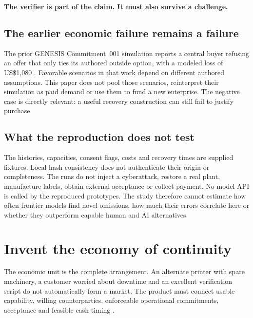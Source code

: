 \documentclass[11pt,a4paper]{article}
\newcommand{\chapterpage}{\clearpage}
\begin{document}
\begin{insight}
\textbf{The verifier is part of the claim. It must also survive a challenge.}
\end{insight}

\subsection{The earlier economic failure remains a failure}
The prior GENESIS Commitment~001 simulation reports a central buyer refusing an offer that only ties its authored outside option, with a modeled loss of US\$1,080 \cite{genesisResults}. Favorable scenarios in that work depend on different authored assumptions. This paper does not pool those scenarios, reinterpret their simulation as paid demand or use them to fund a new enterprise. The negative case is directly relevant: a useful recovery construction can still fail to justify purchase.

\subsection{What the reproduction does not test}
The histories, capacities, consent flags, costs and recovery times are supplied fixtures. Local hash consistency does not authenticate their origin or completeness. The runs do not inject a cyberattack, restore a real plant, manufacture labels, obtain external acceptance or collect payment. No model API is called by the reproduced prototypes. The study therefore cannot estimate how often frontier models find novel omissions, how much their errors correlate here or whether they outperform capable human and AI alternatives.

\chapterpage
\section{Invent the economy of continuity}\label{sec:economy}
The economic unit is the complete arrangement. An alternate printer with spare machinery, a customer worried about downtime and an excellent verification script do not automatically form a market. The product must connect usable capability, willing counterparties, enforceable operational commitments, acceptance and feasible cash timing \cite{boucherEconomy}.
\end{document}
